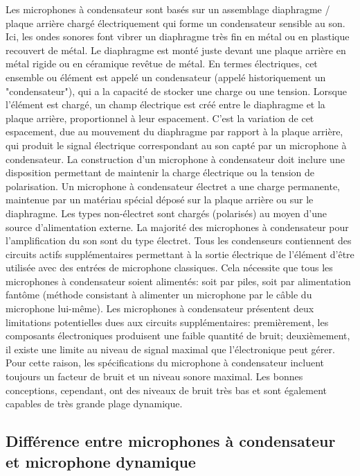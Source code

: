 \documentclass[a4paper, 12pt]{book}
\begin{document}
Les microphones à condensateur sont basés sur un assemblage diaphragme / plaque arrière chargé électriquement qui forme un condensateur sensible au son. Ici, les ondes sonores font vibrer un diaphragme très fin en métal ou en plastique recouvert de métal. Le diaphragme est monté juste devant une plaque arrière en métal rigide ou en céramique revêtue de métal. En termes électriques, cet ensemble ou élément est appelé un condensateur (appelé historiquement un "condensateur"), qui a la capacité de stocker une charge ou une tension. Lorsque l'élément est chargé, un champ électrique est créé entre le diaphragme et la plaque arrière, proportionnel à leur espacement. C’est la variation de cet espacement, due au mouvement du diaphragme par rapport à la plaque arrière, qui produit le signal électrique correspondant au son capté par un microphone à condensateur. La construction d’un microphone à condensateur doit inclure une disposition permettant de maintenir la charge électrique ou la tension de polarisation. Un microphone à condensateur électret a une charge permanente, maintenue par un matériau spécial déposé sur la plaque arrière ou sur le diaphragme. Les types non-électret sont chargés (polarisés) au moyen d'une source d'alimentation externe. La majorité des microphones à condensateur pour l’amplification du son sont du type électret. Tous les condenseurs contiennent des circuits actifs supplémentaires permettant à la sortie électrique de l'élément d'être utilisée avec des entrées de microphone classiques. Cela nécessite que tous les microphones à condensateur soient alimentés: soit par piles, soit par alimentation fantôme (méthode consistant à alimenter un microphone par le câble du microphone lui-même). Les microphones à condensateur présentent deux limitations potentielles dues aux circuits supplémentaires: premièrement, les composants électroniques produisent une faible quantité de bruit; deuxièmement, il existe une limite au niveau de signal maximal que l’électronique peut gérer. Pour cette raison, les spécifications du microphone à condensateur incluent toujours un facteur de bruit et un niveau sonore maximal. Les bonnes conceptions, cependant, ont des niveaux de bruit très bas et sont également capables de très grande plage dynamique.

\subsection{Différence entre microphones à condensateur et microphone dynamique}
\end{document}
